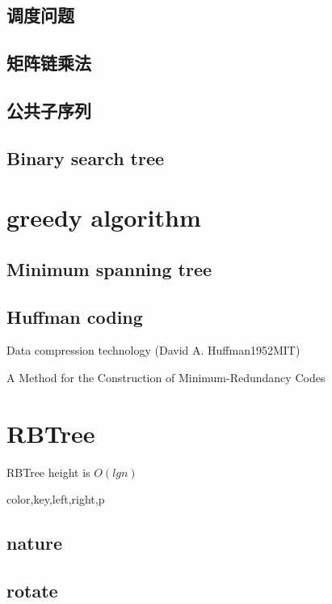 \documentclass[oneside,12pt,twiside,a4paper]{ctexbook}
\begin{document}
\section{调度问题}
\section{矩阵链乘法}
\section{公共子序列}
\section{Binary search tree}

%
\chapter{greedy algorithm}
\section{Minimum spanning tree}
\section{Huffman coding}
Data compression technology (David A. Huffman1952MIT)

A Method for the Construction of Minimum-Redundancy Codes

%
\chapter{RBTree}
RBTree height is $O(lgn)$

color,key,left,right,p

\section{nature}

\section{rotate}
\end{document}
